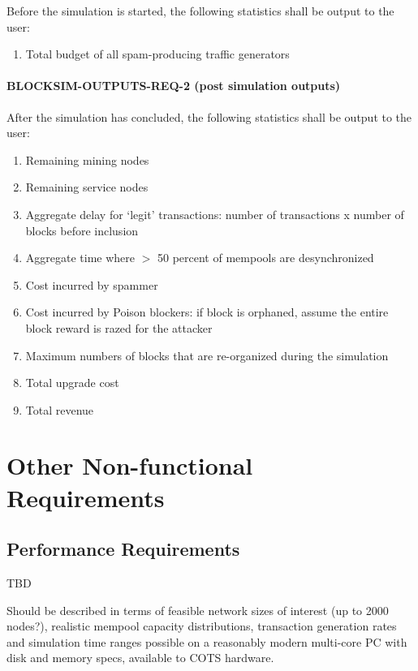 \documentclass{scrreprt}
\begin{document}
Before the simulation is started, the following statistics shall be output
to the user:

\begin{enumerate}
   \item Total budget of all spam-producing traffic generators
\end{enumerate}


\subsubsection{BLOCKSIM-OUTPUTS-REQ-2 (post simulation outputs)}

After the simulation has concluded, the following statistics shall be output
to the user:

\begin{enumerate}
   \item Remaining mining nodes
   \item Remaining service nodes
   \item Aggregate delay for `legit' transactions: number of transactions x number of blocks before inclusion
   \item Aggregate time where $>$ 50 percent of mempools are desynchronized
   \item Cost incurred by spammer
   \item Cost incurred by Poison blockers: if block is orphaned, assume the entire block reward is razed for the attacker
   \item Maximum numbers of blocks that are re-organized during the simulation
   \item Total upgrade cost
   \item Total revenue
\end{enumerate}


\chapter{Other Non-functional Requirements}

\section{Performance Requirements}
TBD

Should be described in terms of feasible network sizes of interest (up to 2000 nodes?),
realistic mempool capacity distributions, transaction generation rates and simulation
time ranges possible on a reasonably modern multi-core PC with disk and memory specs,
available to COTS hardware.
\end{document}
